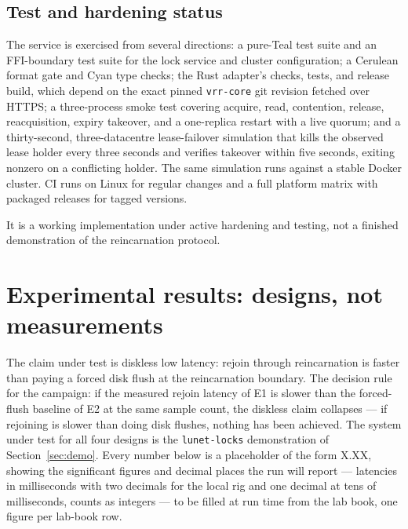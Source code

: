 \documentclass[10pt,journal,letterpaper]{IEEEtran}
\newcommand{\code}[1]{\texttt{#1}}
\begin{document}
\subsection{Test and hardening status}
The service is exercised from several directions: a pure-Teal test suite and
an FFI-boundary test suite for the lock service and cluster configuration; a
Cerulean format gate and Cyan type checks; the Rust adapter's checks, tests,
and release build, which depend on the exact pinned \code{vrr-core} git
revision fetched over HTTPS; a three-process smoke test covering acquire,
read, contention, release, reacquisition, expiry takeover, and a one-replica
restart with a live quorum; and a thirty-second, three-datacentre
lease-failover simulation that kills the observed lease holder every three
seconds and verifies takeover within five seconds, exiting nonzero on a
conflicting holder. The same simulation runs against a stable Docker
cluster. CI runs on Linux for regular changes and a full platform matrix
with packaged releases for tagged versions.

It is a working implementation under active hardening and testing, not a
finished demonstration of the reincarnation protocol.

\section{Experimental results: designs, not measurements}\label{sec:experiments}

The claim under test is diskless low latency: rejoin through reincarnation
is faster than paying a forced disk flush at the reincarnation boundary. The
decision rule for the campaign: if the measured rejoin latency of E1 is
slower than the forced-flush baseline of E2 at the same sample count, the
diskless claim collapses --- if rejoining is slower than doing disk flushes,
nothing has been achieved. The system under test for all four designs is the
\code{lunet-locks} demonstration of Section~\ref{sec:demo}. Every number
below is a placeholder of the form X.XX, showing the significant figures and
decimal places the run will report --- latencies in milliseconds with two
decimals for the local rig and one decimal at tens of milliseconds, counts
as integers --- to be filled at run time from the lab book, one figure per
lab-book row.
\end{document}

